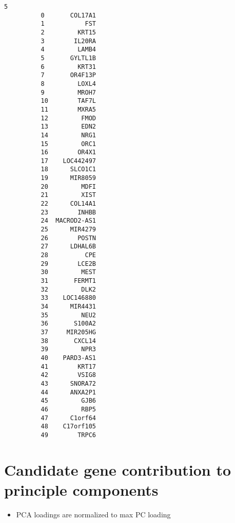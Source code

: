 \documentclass[11pt]{article}
\providecommand{\tightlist}{%
      \setlength{\itemsep}{0pt}\setlength{\parskip}{0pt}}
\begin{document}
\begin{Verbatim}[commandchars=\\\{\}]
                        5  
          0       COL17A1  
          1           FST  
          2         KRT15  
          3        IL20RA  
          4         LAMB4  
          5       GYLTL1B  
          6         KRT31  
          7       OR4F13P  
          8         LOXL4  
          9         MROH7  
          10        TAF7L  
          11        MXRA5  
          12         FMOD  
          13         EDN2  
          14         NRG1  
          15         ORC1  
          16        OR4X1  
          17    LOC442497  
          18      SLCO1C1  
          19      MIR8059  
          20         MDFI  
          21         XIST  
          22      COL14A1  
          23        INHBB  
          24  MACROD2-AS1  
          25      MIR4279  
          26        POSTN  
          27      LDHAL6B  
          28          CPE  
          29        LCE2B  
          30         MEST  
          31       FERMT1  
          32         DLK2  
          33    LOC146880  
          34      MIR4431  
          35         NEU2  
          36       S100A2  
          37     MIR205HG  
          38       CXCL14  
          39         NPR3  
          40    PARD3-AS1  
          41        KRT17  
          42        VSIG8  
          43      SNORA72  
          44      ANXA2P1  
          45         GJB6  
          46         RBP5  
          47      C1orf64  
          48    C17orf105  
          49        TRPC6  
\end{Verbatim}
            
    \section{Candidate gene contribution to principle
components}\label{candidate-gene-contribution-to-principle-components}

\begin{itemize}
\tightlist
\item
  PCA loadings are normalized to max PC loading
\end{itemize}
\end{document}
